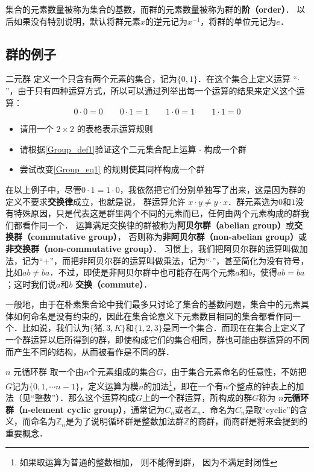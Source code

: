 集合的元素数量被称为集合的基数，而群的元素数量被称为群的\textbf{阶（order）}． 以后如果没有特别说明，默认将群元素$x$的逆元记为$x^{-1}$，将群的单位元记为$e$．

\subsection{群的例子}

\begin{exercise}{二元群}\label{Group_exe1}
定义一个只含有两个元素的集合，记为$\{0, 1\}$．在这个集合上定义运算 “$\cdot$”，由于只有四种运算方式，所以可以通过列举出每一个运算的结果来定义这个运算：
\begin{equation}\label{Group_eq1}
0\cdot0=0 \qquad 0\cdot1=1 \qquad 1\cdot0=1 \qquad 1\cdot1=0
\end{equation}
\begin{itemize}
\item 请用一个 $2\times2$ 的表格表示运算规则
\item 请根据\autoref{Group_def1}验证这个二元集合配上运算 $\cdot$ 构成一个群
\item 尝试改变\autoref{Group_eq1} 的规则使其同样构成一个群
\end{itemize}
\end{exercise}

在以上例子中，尽管$0\cdot1=1\cdot0$，我依然把它们分别单独写了出来，这是因为群的定义不要求\textbf{交换律}成立，也就是说， 群运算允许 $x\cdot y\neq y\cdot x$．群元素选为$0$和$1$没有特殊原因，只是代表这是群里两个不同的元素而已，任何由两个元素构成的群我们都看作同一个． 运算满足交换律的群被称为\textbf{阿贝尔群（abelian group）}或\textbf{交换群（commutative group）}， 否则称为\textbf{非阿贝尔群（non-abelian group）}或\textbf{非交换群（non-commutative group）}． 习惯上，我们把阿贝尔群的运算叫做加法，记为“$+$”，而把非阿贝尔群的运算叫做乘法，记为“$\cdot$”，甚至简化为没有符号，比如$ab\not= ba$．不过，即使是非阿贝尔群中也可能存在两个元素$a$和$b$，使得$ab=ba$；这时我们说$a$和$b$ \textbf{交换（commute）}．

一般地，由于在朴素集合论中我们最多只讨论了集合的基数问题，集合中的元素具体如何命名是没有约束的，因此在集合论意义下元素数目相同的集合都看作同一个．比如说，我们认为$\{\text{猪},3, K\}$和$\{1,2,3\}$是同一个集合．而现在在集合上定义了一个群运算以后所得到的群，即使构成它们的集合相同，群也可能由群运算的不同而产生不同的结构，从而被看作是不同的群．

\begin{example}{$n$ 元循环群}\label{Group_ex2}
取一个由$n$个元素组成的集合$G$，由于集合元素命名的任意性，不妨把$G$记为$\{0, 1, \cdots n-1\}$，定义运算为模$n$的加法\footnote{如果取运算为普通的整数相加， 则不能得到群， 因为不满足封闭性}，即在一个有$n$个整点的钟表上的加法（见“整数”）．那么这个运算构成$G$上的一个群运算，所构成的群$G$称为 \textbf{$n$元循环群（n-element cyclic group）}，通常记为$C_n$或者$\mathbb{Z}_n$．命名为$C_n$是取“cyclic”的含义，而命名为$\mathbb{Z}_n$是为了说明循环群是整数加法群$\mathbb{Z}$的商群，而商群是将来会提到的重要概念．
\end{example}

